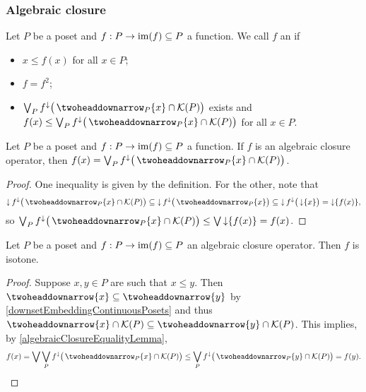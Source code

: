 \subsubsection{Algebraic closure}
\begin{definition}
Let $P$ be a poset and $f: P\to \operatorname{im}(f) \subseteq P$ a function. We call $f$ an  if
\begin{itemize}
\item $x \leq f(x)$ for all $x\in P$;
\item $f = f^2$;
\item $\bigvee_{P} f^\imf\big(\ddownset_P\{x\}\cap \compacts(P)\big)$ exists and $f(x) \leq \bigvee_{P} f^\imf\big(\ddownset_P\{x\}\cap \compacts(P)\big)$ for all $x\in P$.
\end{itemize}
\end{definition}

\begin{lemma} \label{algebraicClosureEqualityLemma}
Let $P$ be a poset and $f: P\to \operatorname{im}(f) \subseteq P$ a function.
If $f$ is an algebraic closure operator, then $f(x) = \bigvee_{P} f^\imf\big(\ddownset_P\{x\}\cap \compacts(P)\big)$.
\end{lemma}
\begin{proof}
One inequality is given by the definition. For the other, note that
\[ \downset f^\imf\big(\ddownset_P \{x\}\cap \compacts(P)\big) \subseteq \downset f^\imf\big(\ddownset_P \{x\}\big) \subseteq \downset f^\imf\big(\downset \{x\}\big) = \downset \{f(x)\}, \]
so $\bigvee_P f^\imf\big(\ddownset_P \{x\}\cap \compacts(P)\big) \leq \bigvee \downset\{f(x)\} = f(x)$.
\end{proof}

\begin{lemma}
Let $P$ be a poset and $f: P\to \operatorname{im}(f) \subseteq P$ an algebraic closure operator. Then $f$ is isotone.
\end{lemma}
\begin{proof}
Suppose $x,y\in P$ are such that $x\leq y$. Then $\ddownset\{x\} \subseteq \ddownset\{y\}$ by \ref{downsetEmbeddingContinuousPosets} and thus $\ddownset \{x\}\cap \compacts(P) \subseteq \ddownset \{y\}\cap \compacts(P)$. This implies, by \ref{algebraicClosureEqualityLemma},
\[ f(x) = \bigvee \bigvee_{P} f^\imf\big(\ddownset_P\{x\}\cap \compacts(P)\big) \leq \bigvee_{P} f^\imf\big(\ddownset_P\{y\}\cap \compacts(P)\big) = f(y). \]
\end{proof}

